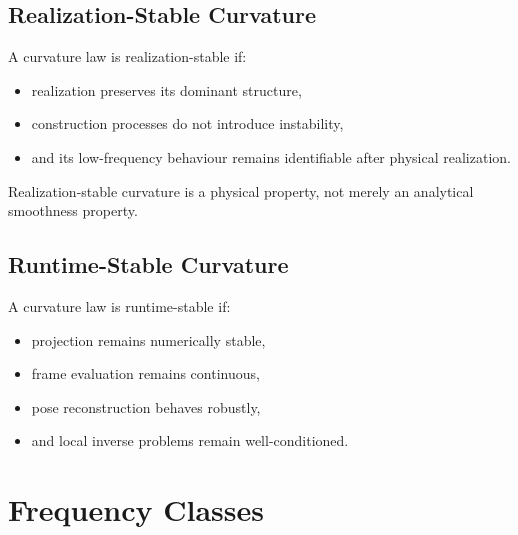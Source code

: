 
\subsection{Realization-Stable Curvature}

\begin{definition}
\label{def:realization-stable-curvature}
A curvature law is realization-stable if:
\begin{itemize}
\item realization preserves its dominant structure,
\item construction processes do not introduce instability,
\item and its low-frequency behaviour remains identifiable after
physical realization.
\end{itemize}
\end{definition}

Realization-stable curvature is a physical property, not merely an
analytical smoothness property.


\subsection{Runtime-Stable Curvature}

\begin{definition}
\label{def:runtime-stable-curvature}
A curvature law is runtime-stable if:
\begin{itemize}
\item projection remains numerically stable,
\item frame evaluation remains continuous,
\item pose reconstruction behaves robustly,
\item and local inverse problems remain well-conditioned.
\end{itemize}
\end{definition}

\section{Frequency Classes}

